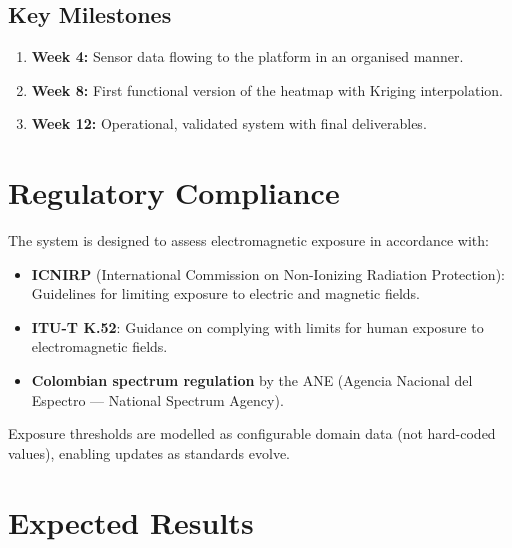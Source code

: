 \documentclass[12pt,a4paper]{article}
\begin{document}
\subsection{Key Milestones}

\begin{enumerate}[leftmargin=*]
  \item \textbf{Week 4:} Sensor data flowing to the platform in an organised manner.
  \item \textbf{Week 8:} First functional version of the heatmap with Kriging interpolation.
  \item \textbf{Week 12:} Operational, validated system with final deliverables.
\end{enumerate}

\section{Regulatory Compliance}

The system is designed to assess electromagnetic exposure in accordance with:

\begin{itemize}
  \item \textbf{ICNIRP} (International Commission on Non-Ionizing Radiation Protection): Guidelines for limiting exposure to electric and magnetic fields.
  \item \textbf{ITU-T K.52}: Guidance on complying with limits for human exposure to electromagnetic fields.
  \item \textbf{Colombian spectrum regulation} by the ANE (Agencia Nacional del Espectro --- National Spectrum Agency).
\end{itemize}

Exposure thresholds are modelled as configurable domain data (not hard-coded values), enabling updates as standards evolve.

\section{Expected Results}
\end{document}
